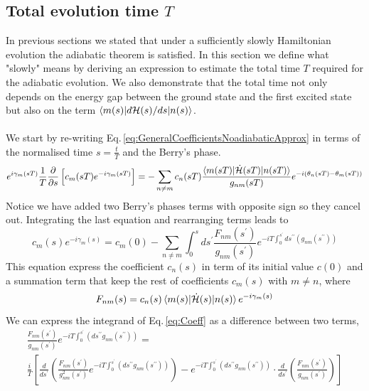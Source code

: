 \subsection{Total evolution time $T$}
In previous sections we stated that under a sufficiently slowly Hamiltonian evolution the adiabatic theorem is satisfied. In this section we define what "slowly" means by deriving an expression to estimate the total time $T$ required for the adiabatic evolution. We also demonstrate that the total time not only depends on the energy gap between the ground state and the first excited state but also on the term $\braket{m(s)|d\mathcal{H}(s)/ds|n(s)}$.\\\\
We start by re-writing Eq.\,\eqref{eq:GeneralCoefficientsNoadiabaticApprox} in terms of the normalised time $s = \frac{t}{T}$ and the Berry's phase.
\begin{equation}
    e^{i\gamma_{m}(sT)}\frac{1}{T}\frac{\partial }{\partial s}\left[c_{m}(sT)e^{-i\gamma_{m}(sT)}\right] = -\sum_{n\neq m} c_{n}(sT) \frac{\braket{m(sT)|\dot{\mathcal{H}}(sT)|n(sT)}}{g_{nm}(sT)}e^{-i\left(\theta_{n}(sT) - \theta_{m}(sT)\right)}
\end{equation}
Notice we have added two Berry's phases terms with opposite sign so they cancel out. Integrating the last equation and rearranging terms leads to
\begin{equation}
\label{eq:Coeff}
    c_{m}(s)e^{-i\gamma_{m}(s)} = c_{m}(0) - \sum_{n\neq m}\int_{0}^{s} ds^{\prime}\frac{F_{nm}(s^{\prime})}{g_{nm}(s^{\prime})}e^{-iT\int_{0}^{s^{\prime}}ds^{\prime\prime}\left(g_{nm}(s^{\prime\prime})\right)}
\end{equation}
This equation express the coefficient $c_{n}(s)$ in term of its initial value $c(0)$ and a summation term that keep the rest of coefficients $c_{m}(s)$ with $m\neq n$, where
\begin{equation}
\label{eq:Fnm}
    F_{nm}(s) = c_{n}(s)\braket{m(s)|\dot{\mathcal{H}}(s)|n(s)} e^{-i\gamma_{m}(s)}
\end{equation}
We can express the integrand of Eq.\,\eqref{eq:Coeff} as a difference between two terms,
\begin{align}
\frac{F_{nm}(s^{\prime})}{g_{nm}(s^{\prime})} e^{-iT\int_{0}^{s^{\prime}}\left(ds^{\prime \prime}g_{nm}(s^{\prime\prime}) \right)}= \\
\frac{i}{T}\left[\frac{d}{ds^{\prime}}\left(\frac{F_{nm}(s^{\prime})}{g^{2}_{nm}(s^{\prime})}e^{-iT\int_{0}^{s^{\prime}}\left(ds^{\prime \prime}g_{nm}(s^{\prime\prime}) \right)}\right) - e^{-iT\int_{0}^{s^{\prime}}\left(ds^{\prime \prime}g_{nm}(s^{\prime\prime}) \right)} \cdot \frac{d}{ds^{\prime}}\left(\frac{F_{nm}(s^{\prime})}{g_{nm}(s^{\prime})}\right)\right] 
 \end{align}
